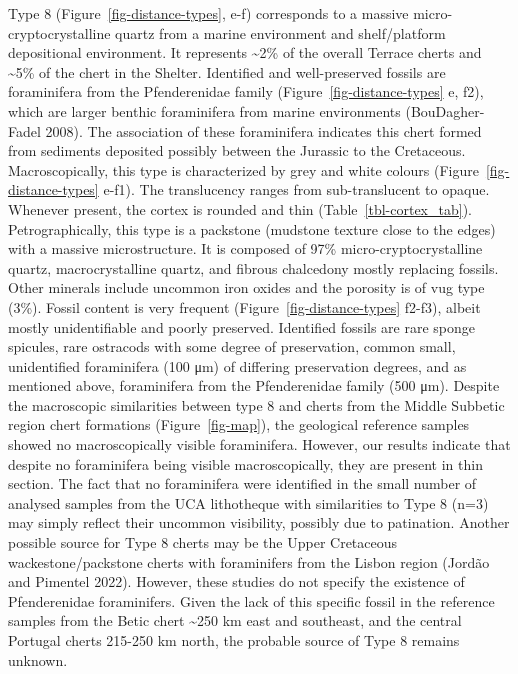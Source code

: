 \documentclass[
  a4paper,
  DIV=11,
  numbers=noendperiod]{scrreprt}
\begin{document}
Type 8 (Figure~\ref{fig-distance-types}, e-f) corresponds to a massive
micro-cryptocrystalline quartz from a marine environment and
shelf/platform depositional environment. It represents
\textasciitilde2\% of the overall Terrace cherts and \textasciitilde5\%
of the chert in the Shelter. Identified and well-preserved fossils are
foraminifera from the Pfenderenidae family
(Figure~\ref{fig-distance-types} e, f2), which are larger benthic
foraminifera from marine environments (BouDagher-Fadel 2008). The
association of these foraminifera indicates this chert formed from
sediments deposited possibly between the Jurassic to the Cretaceous.
Macroscopically, this type is characterized by grey and white colours
(Figure~\ref{fig-distance-types} e-f1). The translucency ranges from
sub-translucent to opaque. Whenever present, the cortex is rounded and
thin (Table~\ref{tbl-cortex_tab}). Petrographically, this type is a
packstone (mudstone texture close to the edges) with a massive
microstructure. It is composed of 97\% micro-cryptocrystalline quartz,
macrocrystalline quartz, and fibrous chalcedony mostly replacing
fossils. Other minerals include uncommon iron oxides and the porosity is
of vug type (3\%). Fossil content is very frequent
(Figure~\ref{fig-distance-types} f2-f3), albeit mostly unidentifiable
and poorly preserved. Identified fossils are rare sponge spicules, rare
ostracods with some degree of preservation, common small, unidentified
foraminifera (100 μm) of differing preservation degrees, and as
mentioned above, foraminifera from the Pfenderenidae family (500 μm).
Despite the macroscopic similarities between type 8 and cherts from the
Middle Subbetic region chert formations (Figure~\ref{fig-map}), the
geological reference samples showed no macroscopically visible
foraminifera. However, our results indicate that despite no foraminifera
being visible macroscopically, they are present in thin section. The
fact that no foraminifera were identified in the small number of
analysed samples from the UCA lithotheque with similarities to Type 8
(n=3) may simply reflect their uncommon visibility, possibly due to
patination. Another possible source for Type 8 cherts may be the Upper
Cretaceous wackestone/packstone cherts with foraminifers from the Lisbon
region (Jordão and Pimentel 2022). However, these studies do not specify
the existence of Pfenderenidae foraminifers. Given the lack of this
specific fossil in the reference samples from the Betic chert
\textasciitilde250 km east and southeast, and the central Portugal
cherts 215-250 km north, the probable source of Type 8 remains unknown.
\end{document}
